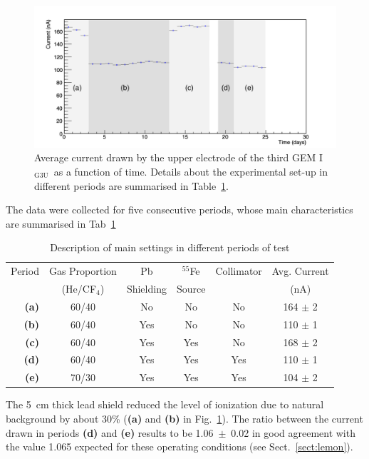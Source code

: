 \documentclass[a4paper,11pt]{article}
\newcommand{\Ig}  {I$_{\mathrm{G3U}}$}
\begin{document}
\begin{figure}[ht]
	\centering
	\includegraphics[width=0.79\linewidth]{Figures/c2_periods.png} 
  	\caption{Average current drawn by the upper electrode of the third GEM \Ig\ as a function of time. Details about the experimental set-up in different periods are summarised in Table~\ref{tab:period}.}
  	\label{fig:period}
\end{figure}

The data were collected for five consecutive periods, whose main characteristics are summarised in Tab~\ref{tab:period}
\begin{table}[h!]
\caption{Description of main settings in different periods of test}
\begin{center}
\begin{tabular}{ |r|c|c|c|c|c| } 
 \hline
 Period & Gas Proportion & Pb        & $^{55}$Fe & Collimator & Avg. Current\\ 
        & (He/CF$_4$)    & Shielding & Source    &            & (nA)\\ 
 \hline
 \hline
 {\bf (a)} & 60/40 & No & No & No  & 164 $\pm$ 2\\
 {\bf (b)} & 60/40 & Yes & No & No & 110 $\pm$ 1\\
 {\bf (c)} & 60/40 & Yes & Yes & No & 168 $\pm$ 2 \\
 {\bf (d)} & 60/40 & Yes & Yes & Yes & 110 $\pm$ 1\\
 {\bf (e)} & 70/30 & Yes & Yes & Yes & 104 $\pm$ 2\\
 \hline
\end{tabular}
\end{center}
\label{tab:period}
\end{table}

The 5~cm thick lead shield reduced the level of ionization due to natural background by about 30\% ({\bf (a)} and {\bf (b)} in Fig.~\ref{fig:period}). 
The ratio between the current drawn in periods {\bf (d)} and {\bf (e)} results to be 1.06~$\pm$~0.02 in good agreement with the value 1.065 expected for these operating conditions (see Sect.~\ref{sect:lemon}).
\end{document}
